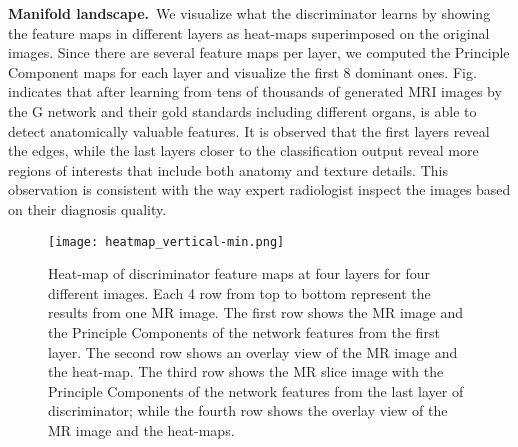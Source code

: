 \documentclass{journal}
\begin{document}
\noindent\textbf{Manifold landscape.}~We visualize what the discriminator learns by showing the feature maps in different layers as heat-maps superimposed on the original images. Since there are several feature maps per layer, we computed the Principle Component maps for each layer and visualize the first $8$ dominant ones. Fig.~ indicates that after learning from tens of thousands of generated MRI images by the G network and their gold standards including different organs, is able to detect anatomically valuable features. It is observed that the first layers reveal the edges, while the last layers closer to the classification output reveal more regions of interests that include both anatomy and texture details. This observation is consistent with the way expert radiologist inspect the images based on their diagnosis quality. 



\begin{figure}[ht!]
	\centering
	\hspace{0cm}\texttt{[image: heatmap\_vertical-min.png]}
	\caption{Heat-map of discriminator feature maps at four layers for four different images. Each 4 row from top to bottom represent the results from one MR image. The first row shows the MR image and the Principle Components of the network features from the first layer. The second row shows an overlay view of the MR image and the heat-map. The third row shows the MR slice image with the Principle Components of the network features from the last layer of discriminator; while the fourth row shows the overlay view of the MR image and the heat-maps.}
	\label{fig:fig_heatmap}
\end{figure}





\end{document}

